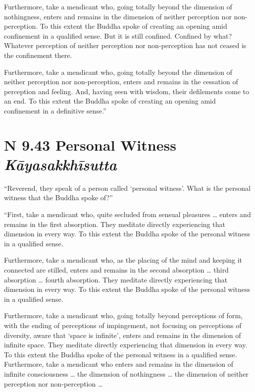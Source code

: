 \documentclass[12pt,openany]{book}%
\newcommand*{\suttatitleacronym}[1]{\smaller[2]{#1}\vspace*{.3em}}
\newcommand*{\suttatitletranslation}[1]{\linebreak{#1}}
\newcommand*{\suttatitleroot}[1]{\linebreak\smaller[2]\itshape{#1}}
\newcommand*{\tocacronym}[1]{\hspace*{-3.3em}{#1}\quad}
\newcommand*{\toctranslation}[1]{#1}
\newcommand*{\tocroot}[1]{(\textit{#1})}
\begin{document}
Furthermore, take a mendicant who, going totally beyond the dimension of nothingness, enters and remains in the dimension of neither perception nor non-perception. To this extent the Buddha spoke of creating an opening amid confinement in a qualified sense. But it is still confined. Confined by what? Whatever perception of neither perception nor non-perception has not ceased is the confinement there. 

Furthermore, take a mendicant who, going totally beyond the dimension of neither perception nor non-perception, enters and remains in the cessation of perception and feeling. And, having seen with wisdom, their defilements come to an end. To this extent the Buddha spoke of creating an opening amid confinement in a definitive sense.” 

%
\section*{{\suttatitleacronym AN 9.43}{\suttatitletranslation A Personal Witness }{\suttatitleroot Kāyasakkhīsutta}}
\addcontentsline{toc}{section}{\tocacronym{AN 9.43} \toctranslation{A Personal Witness } \tocroot{Kāyasakkhīsutta}}

“Reverend, they speak of a person called ‘personal witness’. What is the personal witness that the Buddha spoke of?” 

“First, take a mendicant who, quite secluded from sensual pleasures … enters and remains in the first absorption. They meditate directly experiencing that dimension in every way. To this extent the Buddha spoke of the personal witness in a qualified sense. 

Furthermore, take a mendicant who, as the placing of the mind and keeping it connected are stilled, enters and remains in the second absorption … third absorption … fourth absorption. They meditate directly experiencing that dimension in every way. To this extent the Buddha spoke of the personal witness in a qualified sense. 

Furthermore, take a mendicant who, going totally beyond perceptions of form, with the ending of perceptions of impingement, not focusing on perceptions of diversity, aware that ‘space is infinite’, enters and remains in the dimension of infinite space. They meditate directly experiencing that dimension in every way. To this extent the Buddha spoke of the personal witness in a qualified sense. Furthermore, take a mendicant who enters and remains in the dimension of infinite consciousness … the dimension of nothingness … the dimension of neither perception nor non-perception … 
\end{document}
